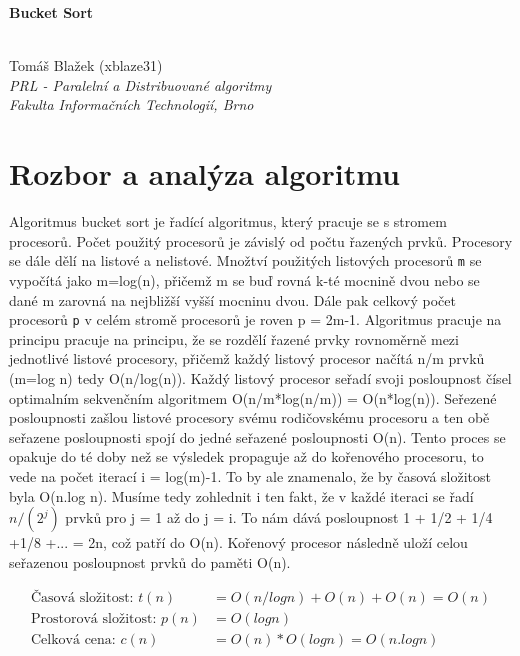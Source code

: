 \documentclass[12pt, a4paper]{article}
\begin{document}
\begin{center}
	\begin{large}\textbf{Bucket Sort}\end{large} \\
	\vspace{0.4cm}
	Tomáš Blažek (xblaze31) \\
	\textit{PRL - Paralelní a Distribuované algoritmy} \\
	\textit{Fakulta Informačních Technologií, Brno} \\
\end{center}



\section{Rozbor a analýza algoritmu}

Algoritmus bucket sort je řadící algoritmus, který pracuje se s stromem procesorů. Počet použitý procesorů je závislý od počtu řazených prvků. Procesory se dále dělí na listové a nelistové. Množtví použitých listových procesorů \texttt{m} se vypočítá jako m=log(n), přičemž m se buď rovná k-té mocnině dvou nebo se dané m zarovná na nejbližší vyšší mocninu dvou. Dále pak celkový počet procesorů \texttt{p} v celém stromě procesorů je roven p = 2m-1. Algoritmus pracuje na principu pracuje na principu, že se rozdělí řazené prvky rovnoměrně mezi jednotlivé listové procesory, přičemž každý listový procesor načítá n/m prvků (m=log n) tedy O(n/log(n)). Každý listový procesor seřadí svoji posloupnost čísel optimalním sekvenčním algoritmem O(n/m*log(n/m)) = O(n*log(n)). Seřezené posloupnosti zašlou listové procesory svému rodičovskému procesoru a ten obě seřazene posloupnosti spojí do jedné seřazené posloupnosti O(n). Tento proces se opakuje do té doby než se výsledek propaguje až do kořenového procesoru, to vede na počet iterací  i = log(m)-1. To by ale znamenalo, že by časová složitost byla O(n.log n). Musíme tedy zohlednit i ten fakt, že v každé iteraci se řadí $n/(2^j)$ prvků pro j = 1 až do j = i. To nám dává posloupnost 1 + 1/2 + 1/4 +1/8 +... = 2n, což patří do O(n). Kořenový procesor následně uloží celou seřazenou posloupnost prvků do paměti O(n). 


\begin{equation} \label{eq1}
\begin{split}
\text{Časová složitost: }t(n) &= O(n/log n) + O(n) + O(n) = O(n)\\
\text{Prostorová složitost: }p(n) &= O(log n)\\
\text{Celková cena: }c(n) &= O(n) * O(log n) = O(n.log n)
\end{split}
\end{equation}
\end{document}
